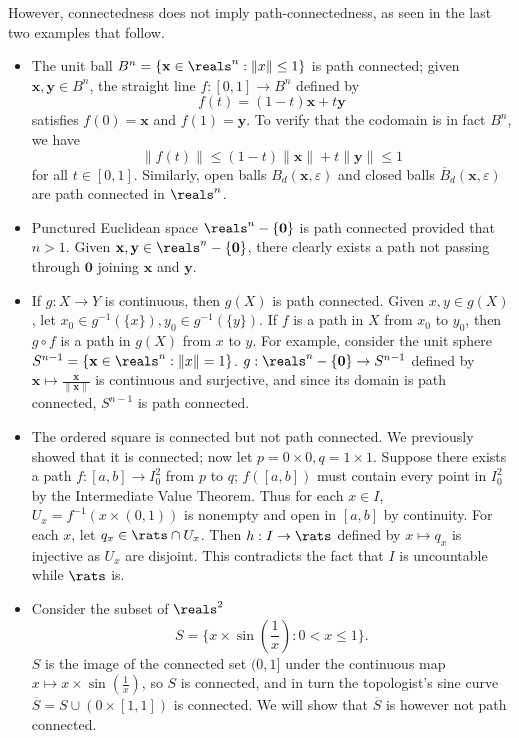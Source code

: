 However, connectedness does not imply path-connectedness, as seen in the last two examples that follow.
\begin{itemize}
    \item The unit ball $B^n = \{\mathbf{x} \in \reals^n: \|x\| \leq 1\}$ is path connected; given $\mathbf{x}, \mathbf{y} \in B^n$, the straight line $f: [0, 1] \rightarrow B^n$ defined by
    $$f(t) = (1-t)\mathbf{x} + t\mathbf{y}$$
    satisfies $f(0) = \mathbf{x}$ and $f(1) = \mathbf{y}$. To verify that the codomain is in fact $B^n$, we have
    $$\|f(t) \| \leq (1-t) \|\mathbf{x}\| + t\|\mathbf{y}\| \leq 1$$
    for all $t\in [0, 1]$. Similarly, open balls $B_d(\mathbf{x}, \varepsilon)$ and closed balls $\overline{B}_d(\mathbf{x}, \varepsilon)$ are path connected in $\reals^n$.

    \item Punctured Euclidean space $\reals^n - \{\mathbf{0}\}$ is path connected provided that $n > 1$. Given $\mathbf{x}, \mathbf{y} \in \reals^n - \{\mathbf{0}\}$, there clearly exists a path not passing through $\mathbf{0}$ joining $\mathbf{x}$ and $\mathbf{y}$.

    \item If $g: X \rightarrow Y$ is continuous, then $g(X)$ is path connected. Given $x, y \in g(X)$, let $x_0 \in g^{-1}(\{x\}), y_0 \in g^{-1}(\{y\})$. If $f$ is a path in $X$ from $x_0$ to $y_0$, then $g \circ f$ is a path in $g(X)$ from $x$ to $y$. For example, consider the unit sphere $S^{n-1} = \{\mathbf{x} \in \reals^n: \|x\| = 1\}$. $g: \reals^n - \{\mathbf{0}\} \rightarrow S^{n-1}$ defined by $\mathbf{x} \mapsto \frac{\mathbf{x}}{\|\mathbf{x}\|}$ is continuous and surjective, and since its domain is path connected, $S^{n-1}$ is path connected.

    \item The ordered square is connected but not path connected. We previously showed that it is connected; now let $p = 0 \times 0, q = 1 \times 1$. Suppose there exists a path $f: [a, b] \rightarrow I_0^2$ from $p$ to $q$; $f([a, b])$ must contain every point in $I_0^2$ by the Intermediate Value Theorem. Thus for each $x \in I$, $U_x = f^{-1}(x \times (0, 1))$ is nonempty and open in $[a, b]$ by continuity. For each $x$, let $q_x \in \rats \cap U_x$. Then $h: I \rightarrow \rats$ defined by $x \mapsto q_x$ is injective as $U_x$ are disjoint. This contradicts the fact that $I$ is uncountable while $\rats$ is.

    \item Consider the subset of $\reals^2$
    $$S = \{x \times \sin \left(\frac1x\right): 0 < x \leq 1\}.$$
    $S$ is the image of the connected set $(0, 1]$ under the continuous map $x \mapsto x \times \sin \left( \frac1x \right)$, so $S$ is connected, and in turn the topologist's sine curve $\overline{S} = S \cup (0 \times [1, 1])$ is connected. We will show that $\overline{S}$ is however not path connected.


\end{itemize}
